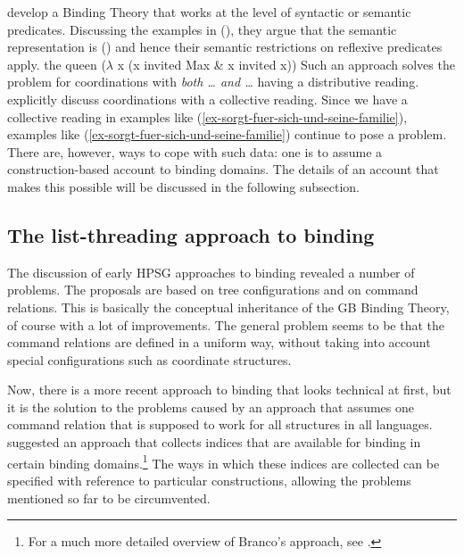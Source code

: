 \documentclass[output=paper,biblatex,babelshorthands,newtxmath,draftmode,colorlinks,citecolor=brown]{langscibook}
\begin{document}
\citet{RR93a} develop a Binding Theory that works at the level of syntactic or semantic
predicates. Discussing the examples in (), they argue that the semantic representation is
() and hence their semantic restrictions on reflexive predicates apply.
\eal
{}
\zl
\ea
the queen ($\lambda$ x (x invited Max \& x invited x))
\z
Such an approach solves the problem for coordinations with \emph{both \ldots{} and \ldots} having a
distributive reading. \citet[]{RR93a} explicitly discuss coordinations with a collective
reading. Since we have a collective reading in examples like
(\ref{ex-sorgt-fuer-sich-und-seine-familie}), examples like (\ref{ex-sorgt-fuer-sich-und-seine-familie}) continue to pose a problem. There are,
however, ways to cope with such data: one is to assume a construction-based account to binding
domains. The details of an account that makes this possible will be discussed in the following subsection.


\subsection{The list-threading approach to binding}


The discussion of early HPSG approaches to binding revealed a number of problems. The proposals are
based on tree configurations and on command relations. This is basically the conceptual inheritance
of the GB Binding Theory, of course with a lot of improvements. The general problem seems to be that
the command relations are defined in a uniform way, without taking into account special configurations such as coordinate structures.

Now, there is a more recent approach to binding that looks technical at first, but it is the
solution to the problems caused by an approach that assumes one command relation that is supposed
to work for all structures in all languages. \citet{Branco2002a} suggested an approach that collects
indices that are available for binding in certain binding domains.\footnote{%
For a much more detailed overview of Branco's approach, see .
}
The ways in which these indices are collected can be specified with reference to particular
constructions, allowing the problems mentioned so far to be circumvented. 
\end{document}
